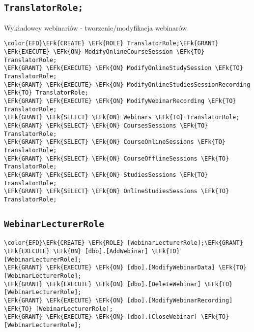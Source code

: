 \documentclass[11pt]{article}
\newcommand{\EFk}[1]{\textcolor{EFk}{\textbf{#1}}} %
\begin{document}
\subsection{\texttt{TranslatorRole;}}
\label{sec:org022dfaf}
Wykładowcy webinariów - tworzenie/modyfikacja webinarów
\begin{Code}
\begin{Verbatim}
\color{EFD}\EFk{CREATE} \EFk{ROLE} TranslatorRole;\EFk{GRANT} \EFk{EXECUTE} \EFk{ON} ModifyOnlineCourseSession \EFk{TO} TranslatorRole;
\EFk{GRANT} \EFk{EXECUTE} \EFk{ON} ModifyOnlineStudySession \EFk{TO} TranslatorRole;
\EFk{GRANT} \EFk{EXECUTE} \EFk{ON} ModifyOnlineStudiesSessionRecording \EFk{TO} TranslatorRole;
\EFk{GRANT} \EFk{EXECUTE} \EFk{ON} ModifyWebinarRecording \EFk{TO} TranslatorRole;
\EFk{GRANT} \EFk{SELECT} \EFk{ON} Webinars \EFk{TO} TranslatorRole;
\EFk{GRANT} \EFk{SELECT} \EFk{ON} CoursesSessions \EFk{TO} TranslatorRole;
\EFk{GRANT} \EFk{SELECT} \EFk{ON} CourseOnlineSessions \EFk{TO} TranslatorRole;
\EFk{GRANT} \EFk{SELECT} \EFk{ON} CourseOfflineSessions \EFk{TO} TranslatorRole;
\EFk{GRANT} \EFk{SELECT} \EFk{ON} StudiesSessions \EFk{TO} TranslatorRole;
\EFk{GRANT} \EFk{SELECT} \EFk{ON} OnlineStudiesSessions \EFk{TO} TranslatorRole;
\end{Verbatim}
\end{Code}
\subsection{\texttt{WebinarLecturerRole}}
\label{sec:org70ab7a4}

\begin{Code}
\begin{Verbatim}
\color{EFD}\EFk{CREATE} \EFk{ROLE} [WebinarLecturerRole];\EFk{GRANT} \EFk{EXECUTE} \EFk{ON} [dbo].[AddWebinar] \EFk{TO} [WebinarLecturerRole];
\EFk{GRANT} \EFk{EXECUTE} \EFk{ON} [dbo].[ModifyWebinarData] \EFk{TO} [WebinarLecturerRole];
\EFk{GRANT} \EFk{EXECUTE} \EFk{ON} [dbo].[DeleteWebinar] \EFk{TO} [WebinarLecturerRole];
\EFk{GRANT} \EFk{EXECUTE} \EFk{ON} [dbo].[ModifyWebinarRecording] \EFk{TO} [WebinarLecturerRole];
\EFk{GRANT} \EFk{EXECUTE} \EFk{ON} [dbo].[CloseWebinar] \EFk{TO} [WebinarLecturerRole];
\end{Verbatim}
\end{Code}
\end{document}
